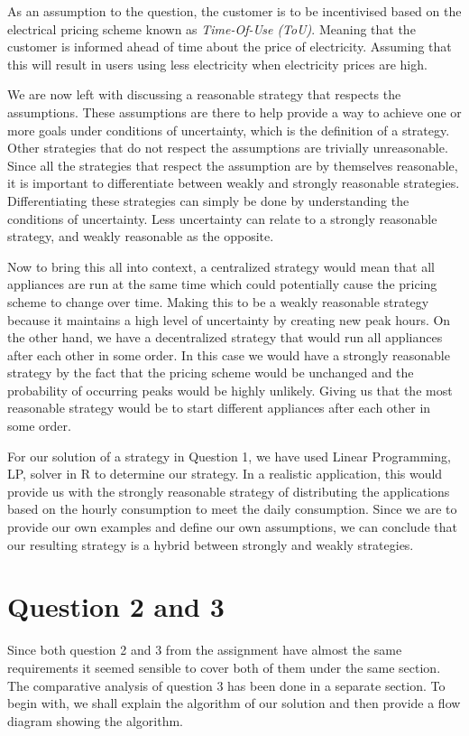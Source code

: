 \documentclass{article}
\begin{document}
	As an assumption to the question, the customer is to be incentivised based on the electrical pricing scheme known as \emph{Time-Of-Use (ToU)}. Meaning that the customer is informed ahead of time about the price of electricity. Assuming that this will result in users using less electricity when electricity prices are high.

	We are now left with discussing a reasonable strategy that respects the assumptions. These assumptions are there to help provide a way to achieve one or more goals under conditions of uncertainty, which is the definition of a strategy. Other strategies that do not respect the assumptions are trivially unreasonable. Since all the strategies that respect the assumption are by themselves reasonable, it is important to differentiate between weakly and strongly reasonable strategies. Differentiating these strategies can simply be done by understanding the conditions of uncertainty. Less uncertainty can relate to a strongly reasonable strategy, and weakly reasonable as the opposite.

	Now to bring this all into context, a centralized strategy would mean that all appliances are run at the same time which could potentially cause the pricing scheme to change over time. Making this to be a weakly reasonable strategy because it maintains a high level of uncertainty by creating new peak hours. On the other hand, we have a decentralized strategy that would run all appliances after each other in some order. In this case we would have a strongly reasonable strategy by the fact that the pricing scheme would be unchanged and the probability of occurring peaks would be highly unlikely. Giving us that the most reasonable strategy would be to start different appliances after each other in some order.

	For our solution of a strategy in Question 1, we have used Linear Programming, LP, solver in R to determine our strategy. In a realistic application, this would provide us with the strongly reasonable strategy of distributing the applications based on the hourly consumption to meet the daily consumption. Since we are to provide our own examples and define our own assumptions, we can conclude that our resulting strategy is a hybrid between strongly and weakly strategies.

\newpage

	\section{Question 2 and 3}
	Since both question 2 and 3 from the assignment have almost the same requirements it seemed sensible to cover both of them under the same section. The comparative analysis of question 3 has been done in a separate section. To begin with, we shall explain the algorithm of our solution and then provide a flow diagram showing the algorithm.
\end{document}
